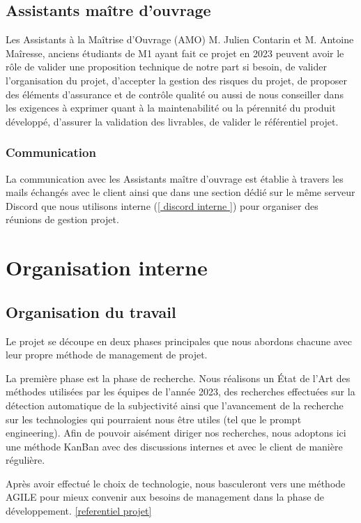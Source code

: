 \documentclass[11pt]{rapport_class}
\begin{document}
\section{Assistants maître d'ouvrage}

\qquad Les Assistants à la Maîtrise d'Ouvrage (AMO) M. Julien Contarin et M. Antoine Maîresse, anciens étudiants de M1 ayant fait ce projet en 2023 peuvent avoir le rôle de valider une proposition technique de notre part si besoin, de valider l'organisation du projet, d'accepter la gestion des risques du projet, de proposer des éléments d'assurance et de contrôle qualité ou aussi de nous conseiller dans les exigences à exprimer quant à la maintenabilité ou la pérennité du produit développé, d'assurer la validation des livrables, de valider le référentiel projet.

\subsection{Communication} 

\qquad La communication avec les Assistants maître d'ouvrage est établie à travers les mails échangés avec le client ainsi que dans une section dédié sur le même serveur Discord que nous utilisons interne (\ref{ discord interne }) pour organiser des réunions de gestion projet.



\chapter{Organisation interne}
\section{Organisation du travail}

\qquad Le projet se découpe en deux phases principales que nous abordons chacune avec leur propre méthode de management de projet.

La première phase est la phase de recherche. Nous réalisons un État de l'Art des méthodes utilisées par les équipes de l'année 2023, des recherches effectuées sur la détection automatique de la subjectivité ainsi que l'avancement de la recherche sur les technologies qui pourraient nous être utiles (tel que le prompt engineering). Afin de pouvoir aisément diriger nos recherches, nous adoptons ici une méthode KanBan avec des discussions internes et avec le client de manière régulière.

Après avoir effectué le choix de technologie, nous basculeront vers une méthode AGILE pour mieux convenir aux besoins de management dans la phase de développement. \ref{referentiel projet}\\
\end{document}
